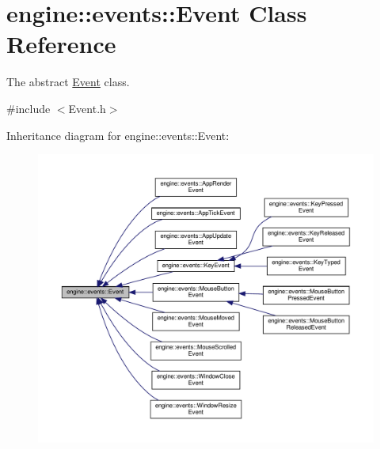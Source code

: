 \hypertarget{classengine_1_1events_1_1Event}{}\section{engine\+:\+:events\+:\+:Event Class Reference}
\label{classengine_1_1events_1_1Event}


The abstract \hyperlink{classengine_1_1events_1_1Event}{Event} class.  




{\ttfamily \#include $<$Event.\+h$>$}



Inheritance diagram for engine\+:\+:events\+:\+:Event\+:
\nopagebreak
\begin{figure}[H]
\begin{center}
\leavevmode
\includegraphics[width=350pt]{classengine_1_1events_1_1Event__inherit__graph}
\end{center}
\end{figure}
